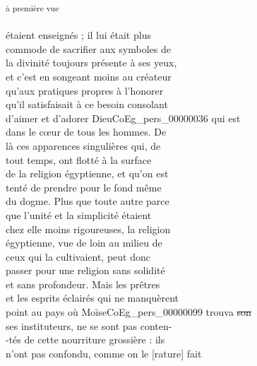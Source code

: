 \documentclass{book}
\begin{document}
{\begin{paracol}{2}
\noindent \\
\\
\\
\\
\\
\\
\\
\\
\\
\\
\begin{flushright}\textsuperscript{à première vue}\end{flushright}
\switchcolumn
\noindent étaient enseignés ; il lui était plus\\
commode de sacrifier aux symboles de\\
la divinité toujours présente à ses yeux,\\
et c’est en songeant moins au créateur\\
qu’aux pratiques propres à l’honorer\\
qu’il satisfaisait à ce besoin consolant\\
d’aimer et d’adorer Dieu\gls{CoEg_pers_00000036} qui est\\
dans le cœur de tous les hommes. De\\
là ces apparences singulières qui, de\\
tout temps, ont flotté à la surface\\
de la religion égyptienne, et qu’on est\\
tenté de prendre pour le fond même\\
du dogme. Plus que toute autre parce\\
que l’unité et la simplicité étaient\\
chez elle moins rigoureuses, la religion\\
égyptienne, vue de loin au milieu de\\
ceux qui la cultivaient, peut donc\\
passer pour une religion sans solidité\\
et sans profondeur. Mais les prêtres\\
et les esprits éclairés qui ne manquèrent\\
point au pays où Moïse\gls{CoEg_pers_00000099} trouva \sout{son}\\
ses instituteurs, ne se sont pas conten-\\
-tés de cette nourriture grossière : ils\\
n’ont pas confondu, comme on le [rature] fait\\

\end{paracol}}
\end{document}
